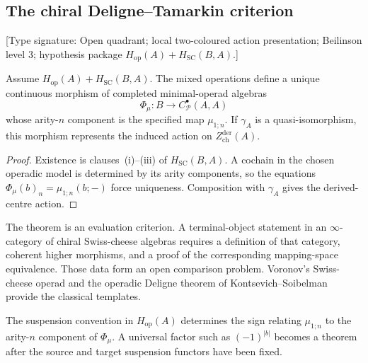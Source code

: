 \subsection{The chiral Deligne--Tamarkin criterion}
\label{subsec:chiral-deligne-tamarkin}

\begin{theorem}
\label{thm:chiral-deligne-tamarkin}
\textup{[Type signature: Open quadrant; local two-coloured action
presentation; Beilinson level \(3\); hypothesis package
\(H_{\mathrm{op}}(A)+H_{\mathrm{SC}}(B,A)\).]}

Assume \(H_{\mathrm{op}}(A)+H_{\mathrm{SC}}(B,A)\).  The mixed
operations define a unique continuous morphism of completed
minimal-operad algebras
\[
 \Phi_\mu\colon B\longrightarrow C^\bullet_{\mathcal P}(A,A)
\]
whose arity-\(n\) component is the specified map \(\mu_{1;n}\).
If \(\gamma_A\) is a quasi-isomorphism, this morphism represents the
induced action on \(Z^{\mathrm{der}}_{\mathrm{ch}}(A)\).
\end{theorem}

\begin{proof}
Existence is clauses~\textup{(i)}--\textup{(iii)} of
\(H_{\mathrm{SC}}(B,A)\).  A cochain in the chosen operadic model is
determined by its arity components, so the equations
\(\Phi_\mu(b)_n=\mu_{1;n}(b;-)\) force uniqueness.  Composition with
\(\gamma_A\) gives the derived-centre action.
\end{proof}

\begin{remark}
The theorem is an evaluation criterion.  A terminal-object statement
in an \(\infty\)-category of chiral Swiss-cheese algebras requires a
definition of that category, coherent higher morphisms, and a proof of
the corresponding mapping-space equivalence.  Those data form an open
comparison problem.  Voronov's Swiss-cheese operad
\cite{Voronov99} and the operadic Deligne theorem of
Kontsevich--Soibelman~\cite{KS00} provide the classical templates.
\end{remark}

\begin{remark}
\label{rem:phi-koszul-sign}
The suspension convention in \(H_{\mathrm{op}}(A)\) determines the
sign relating \(\mu_{1;n}\) to the arity-\(n\) component of
\(\Phi_\mu\).  A universal factor such as \((-1)^{|b|}\) becomes a
theorem after the source and target suspension functors have been
fixed.
\end{remark}

